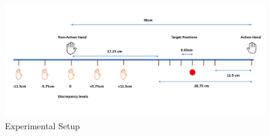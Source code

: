 \begin{figure}
\centering       
    \includegraphics[width=\textwidth, keepaspectratio]{Images/exp2_task.png}
    \caption{Experimental Setup}
    \label{fig:exp2-task}
\end{figure}